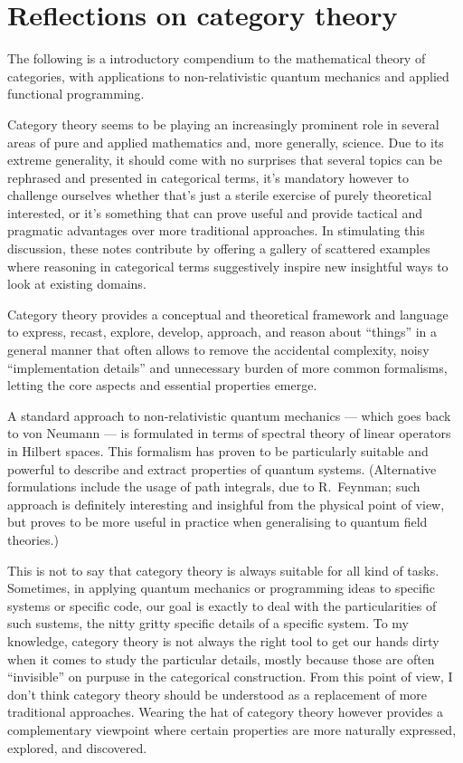 \chapter*{Reflections on category theory}


The following is a introductory compendium to the mathematical theory of categories, with applications to non-relativistic quantum mechanics and applied functional programming. 

Category theory seems to be playing an increasingly prominent role in several areas of pure and applied mathematics and, more generally, science. 
Due to its extreme generality, it should come with no surprises that several topics can be rephrased and presented in categorical terms, it's mandatory however to challenge ourselves whether that's just a sterile exercise of purely theoretical interested, or it's something that can prove useful and provide tactical and pragmatic advantages over more traditional approaches. 
In stimulating this discussion, these notes contribute by offering a gallery of scattered examples where reasoning in categorical terms suggestively inspire new insightful ways to look at existing domains. 

Category theory provides a conceptual and theoretical framework and language to express, recast, explore, develop, approach, and reason about ``things'' in a general manner that often allows to remove the accidental complexity, noisy ``implementation details'' and unnecessary burden of more common formalisms, letting the core aspects and essential properties emerge. 

A standard approach to non-relativistic quantum mechanics --- which goes back to von Neumann --- is formulated in terms of spectral theory of linear operators in Hilbert spaces. This formalism has proven to be particularly suitable and powerful to describe and extract properties of quantum systems. (Alternative formulations include the usage of path integrals, due to R.~Feynman; such approach is definitely interesting and insighful from the physical point of view, but proves to be more useful in practice when generalising to quantum field theories.) 



This is not to say that category theory is always suitable for all kind of tasks. Sometimes, in applying quantum mechanics or programming ideas to specific systems or specific code, our goal is exactly to deal with the particularities of such sustems, the nitty gritty specific details of a specific system. To my knowledge, category theory is not always the right tool to get our hands dirty when it comes to study the particular details, mostly because those are often ``invisible'' on purpuse in the categorical construction. From this point of view, I don't think category theory should be understood as a replacement of more traditional approaches. Wearing the hat of category theory however provides a complementary viewpoint where certain properties are more naturally expressed, explored, and discovered. 

\smallskip

\noindent\textsw{\myLocation, \myTime}


\begin{flushright}
        \myName
\end{flushright}

